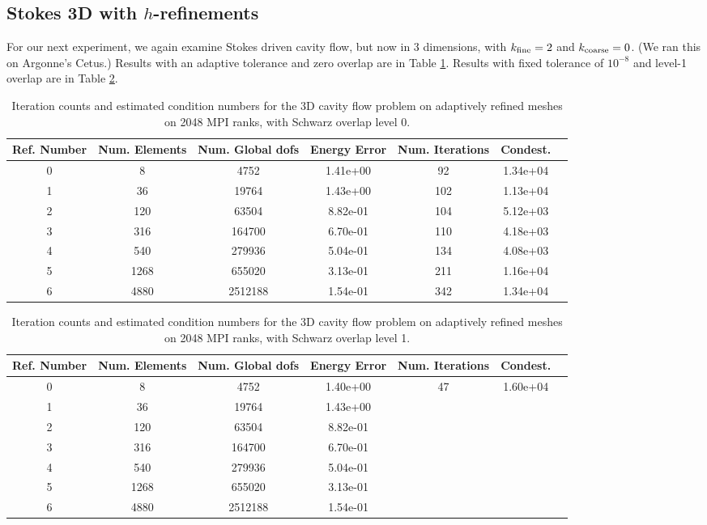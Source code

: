 \documentclass[11pt]{amsart}
\begin{document}
\subsection{Stokes 3D with $h$-refinements}
For our next experiment, we again examine Stokes driven cavity flow, but now in 3 dimensions, with $k_{\rm fine}=2$ and $k_{\rm coarse}=0$.  (We ran this on Argonne's Cetus.)  Results with an adaptive tolerance and zero overlap are in Table \ref{table:stokesConditioningStudyAdaptiveMeshes3DOverlap0}.  Results with fixed tolerance of $10^{-8}$ and level-1 overlap are in Table \ref{table:stokesConditioningStudyAdaptiveMeshes3DOverlap1}.

\begin{table}
\begin{tabular}{ c  c  c  c  c  c c}
Ref. Number	&Num. Elements	& Num. Global dofs		&Energy Error	&Num. Iterations	&Condest.\\
\hline
0	&8		&4752	&1.41e+00	&92		&1.34e+04\\
1	&36		&19764	&1.43e+00	&102		&1.13e+04\\
2	&120		&63504	&8.82e-01		&104		&5.12e+03\\
3	&316		&164700	&6.70e-01		&110		&4.18e+03\\
4	&540		&279936	&5.04e-01		&134		&4.08e+03\\
5	&1268	&655020	&3.13e-01		&211		&1.16e+04\\
6	&4880	&2512188	&1.54e-01		&342		&1.34e+04\\
\end{tabular}
\caption{Iteration counts and estimated condition numbers for the 3D cavity flow problem on adaptively refined meshes on 2048 MPI ranks, with Schwarz overlap level 0.}
\label{table:stokesConditioningStudyAdaptiveMeshes3DOverlap0}
\end{table}

\begin{table}
\begin{tabular}{ c  c  c  c  c  c c}
Ref. Number	&Num. Elements	& Num. Global dofs		&Energy Error	&Num. Iterations	&Condest.\\
\hline
0	&8		&4752	&1.40e+00	&47	&1.60e+04\\
1	&36		&19764	&1.43e+00	&	&\\
2	&120		&63504	&8.82e-01		&	&\\
3	&316		&164700	&6.70e-01		&	&\\
4	&540		&279936	&5.04e-01		&	&\\
5	&1268	&655020	&3.13e-01		&	&\\
6	&4880	&2512188	&1.54e-01		&	&\\
\end{tabular}
\caption{Iteration counts and estimated condition numbers for the 3D cavity flow problem on adaptively refined meshes on 2048 MPI ranks, with Schwarz overlap level 1.}
\label{table:stokesConditioningStudyAdaptiveMeshes3DOverlap1}
\end{table}
\end{document}
